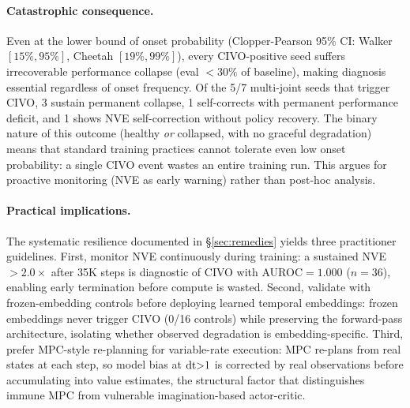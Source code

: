 \paragraph{Catastrophic consequence.}
 Even at the lower bound of onset probability (Clopper-Pearson 95\% CI: Walker $[15\%, 95\%]$, Cheetah $[19\%, 99\%]$), every CIVO-positive seed suffers irrecoverable performance collapse (eval $< 30\%$ of baseline), making diagnosis essential regardless of onset frequency. Of the 5/7 multi-joint seeds that trigger CIVO, 3 sustain permanent collapse, 1 self-corrects with permanent performance deficit, and 1 shows NVE self-correction without policy recovery. The binary nature of this outcome (healthy \emph{or} collapsed, with no graceful degradation) means that standard training practices cannot tolerate even low onset probability: a single CIVO event wastes an entire training run. This argues for proactive monitoring (NVE as early warning) rather than post-hoc analysis.

\paragraph{Practical implications.}
\label{sec:detector}
 The systematic resilience documented in \S\ref{sec:remedies} yields three practitioner guidelines. First, monitor NVE continuously during training: a sustained NVE $> 2.0\times$ after 35K steps is diagnostic of CIVO with AUROC${=}1.000$ ($n{=}36$), enabling early termination before compute is wasted. Second, validate with frozen-embedding controls before deploying learned temporal embeddings: frozen embeddings never trigger CIVO (0/16 controls) while preserving the forward-pass architecture, isolating whether observed degradation is embedding-specific. Third, prefer MPC-style re-planning for variable-rate execution: MPC re-plans from real states at each step, so model bias at $\mathrm{dt}{>}1$ is corrected by real observations before accumulating into value estimates, the structural factor that distinguishes immune MPC from vulnerable imagination-based actor-critic.

